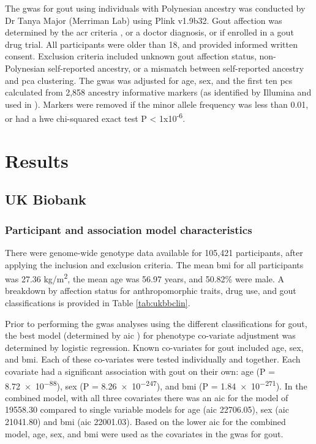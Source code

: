 \documentclass[]{report}
\begin{document}
The \gls{gwas} for gout using individuals with Polynesian ancestry was
conducted by Dr Tanya Major (Merriman Lab) using Plink v1.9b32. Gout
affection was determined by the \gls{acr} criteria \citep{Wallace1977a},
or a doctor diagnosis, or if enrolled in a gout drug trial. All
participants were older than 18, and provided informed written consent.
Exclusion criteria included unknown gout affection status,
non-Polynesian self-reported ancestry, or a mismatch between
self-reported ancestry and \gls{pca} clustering. The \gls{gwas} was
adjusted for age, sex, and the first ten \glspl{pc} calculated from
2,858 ancestry informative markers (as identified by Illumina and used
in \citet{Guo2014}). Markers were removed if the minor allele frequency
was less than 0.01, or had a \gls{hwe} chi-squared exact test P
\textless{} 1x10\textsuperscript{-6}.

\section{Results}\label{results-2}

\subsection{UK Biobank}\label{uk-biobank}

\subsubsection{Participant and association model
characteristics}\label{participant-and-association-model-characteristics}

There were genome-wide genotype data available for 105,421 participants,
after applying the inclusion and exclusion criteria. The mean \gls{bmi}
for all participants was 27.36 kg/m\textsuperscript{2}, the mean age was
56.97 years, and 50.82\% were male. A breakdown by affection status for
anthropomorphic traits, drug use, and gout classifications is provided
in Table \ref{tab:ukbbclin}.

Prior to performing the \gls{gwas} analyses using the different
classifications for gout, the best model (determined by \gls{aic}
\citep{Akaike1974}) for phenotype co-variate adjustment was determined
by logistic regression. Known co-variates for gout included age, sex,
and \gls{bmi}. Each of these co-variates were tested individually and
together. Each covariate had a significant association with gout on
their own: age (P = \num{8.72e-88}), sex (P = \num{8.26e-247}), and
\gls{bmi} (P = \num{1.84e-271}). In the combined model, with all three
covariates there was an \gls{aic} for the model of 19558.30 compared to
single variable models for age (\gls{aic} 22706.05), sex (\gls{aic}
21041.80) and \gls{bmi} (\gls{aic} 22001.03). Based on the lower
\gls{aic} for the combined model, age, sex, and \gls{bmi} were used as
the covariates in the \gls{gwas} for gout.
\end{document}
